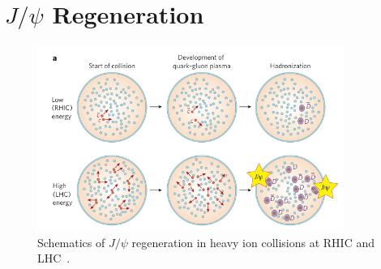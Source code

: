 \section{$J/\psi$ Regeneration}
\label{sec_2_reco}
\begin{figure}[!h]
  \centering
  \includegraphics[width=10cm]{chap2/figure/reco/jpsirege_schematics.png}
  \caption{
  	Schematics of $J/\psi$ regeneration in heavy ion collisions at RHIC and LHC~\cite{bib_regenature}.
	}
  \label{fig_2_recosche}
\end{figure}


